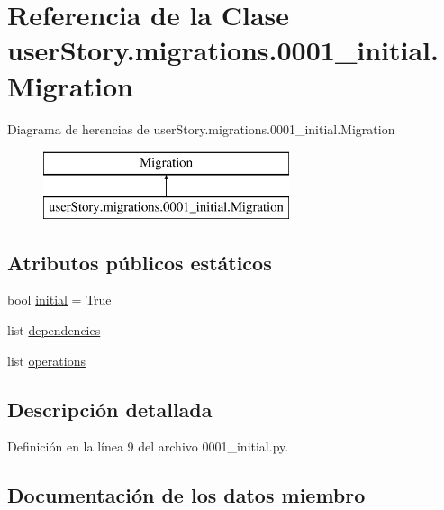 \hypertarget{classuser_story_1_1migrations_1_10001__initial_1_1_migration}{}\section{Referencia de la Clase user\+Story.\+migrations.0001\+\_\+initial.Migration}
\label{classuser_story_1_1migrations_1_10001__initial_1_1_migration}
Diagrama de herencias de user\+Story.\+migrations.0001\+\_\+initial.Migration\begin{figure}[H]
\begin{center}
\leavevmode
\includegraphics[height=2.000000cm]{classuser_story_1_1migrations_1_10001__initial_1_1_migration}
\end{center}
\end{figure}
\subsection*{Atributos públicos estáticos}
\begin{DoxyCompactItemize}
\item 
bool \hyperlink{classuser_story_1_1migrations_1_10001__initial_1_1_migration_a319827a07cd13a2f9d717db93bcb4afc}{initial} = True
\item 
list \hyperlink{classuser_story_1_1migrations_1_10001__initial_1_1_migration_af522aa04449a8d4b8d459e8899d8c0e0}{dependencies}
\item 
list \hyperlink{classuser_story_1_1migrations_1_10001__initial_1_1_migration_af641102b3c30687a6925889fc6665bfd}{operations}
\end{DoxyCompactItemize}


\subsection{Descripción detallada}


Definición en la línea 9 del archivo 0001\+\_\+initial.\+py.



\subsection{Documentación de los datos miembro}
